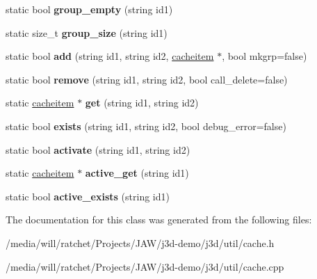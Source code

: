 \begin{DoxyCompactItemize}
\item 
\hypertarget{classj3d_1_1util_1_1cache_a0bcd23a06b0091138a6df26d50fabd33}{}static bool {\bfseries group\+\_\+empty} (string id1)\label{classj3d_1_1util_1_1cache_a0bcd23a06b0091138a6df26d50fabd33}

\item 
\hypertarget{classj3d_1_1util_1_1cache_ada855abd50d935400d308f7a35c90516}{}static size\+\_\+t {\bfseries group\+\_\+size} (string id1)\label{classj3d_1_1util_1_1cache_ada855abd50d935400d308f7a35c90516}

\item 
\hypertarget{classj3d_1_1util_1_1cache_a87f37b7e67ce434657c5b4ee49e7331f}{}static bool {\bfseries add} (string id1, string id2, \hyperlink{classj3d_1_1core_1_1Cacheable}{cacheitem} $\ast$, bool mkgrp=false)\label{classj3d_1_1util_1_1cache_a87f37b7e67ce434657c5b4ee49e7331f}

\item 
\hypertarget{classj3d_1_1util_1_1cache_a8721f6ba21a72fd86ad3041c46bb1322}{}static bool {\bfseries remove} (string id1, string id2, bool call\+\_\+delete=false)\label{classj3d_1_1util_1_1cache_a8721f6ba21a72fd86ad3041c46bb1322}

\item 
\hypertarget{classj3d_1_1util_1_1cache_a76cdbad15bd5161adab22ec8ca9607c7}{}static \hyperlink{classj3d_1_1core_1_1Cacheable}{cacheitem} $\ast$ {\bfseries get} (string id1, string id2)\label{classj3d_1_1util_1_1cache_a76cdbad15bd5161adab22ec8ca9607c7}

\item 
\hypertarget{classj3d_1_1util_1_1cache_ad7b73897796c88aabb7576f28071795c}{}static bool {\bfseries exists} (string id1, string id2, bool debug\+\_\+error=false)\label{classj3d_1_1util_1_1cache_ad7b73897796c88aabb7576f28071795c}

\item 
\hypertarget{classj3d_1_1util_1_1cache_a2cabdd0eaa408701ad188f64e58afb3e}{}static bool {\bfseries activate} (string id1, string id2)\label{classj3d_1_1util_1_1cache_a2cabdd0eaa408701ad188f64e58afb3e}

\item 
\hypertarget{classj3d_1_1util_1_1cache_a3939fb6419f93e062f29b6ec64eb6b63}{}static \hyperlink{classj3d_1_1core_1_1Cacheable}{cacheitem} $\ast$ {\bfseries active\+\_\+get} (string id1)\label{classj3d_1_1util_1_1cache_a3939fb6419f93e062f29b6ec64eb6b63}

\item 
\hypertarget{classj3d_1_1util_1_1cache_a61f5e6fabfa7f873b4ae44fc2f2d7692}{}static bool {\bfseries active\+\_\+exists} (string id1)\label{classj3d_1_1util_1_1cache_a61f5e6fabfa7f873b4ae44fc2f2d7692}

\end{DoxyCompactItemize}


The documentation for this class was generated from the following files\+:\begin{DoxyCompactItemize}
\item 
/media/will/ratchet/\+Projects/\+J\+A\+W/j3d-\/demo/j3d/util/cache.\+h\item 
/media/will/ratchet/\+Projects/\+J\+A\+W/j3d-\/demo/j3d/util/cache.\+cpp\end{DoxyCompactItemize}
